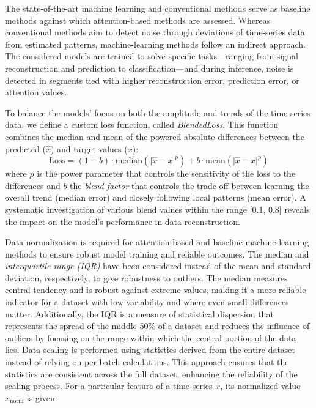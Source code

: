 \documentclass[conference]{IEEEtran}
\begin{document}
The state-of-the-art machine learning and conventional methods serve as baseline methods against which attention-based methods are assessed.
Whereas conventional methods aim to detect noise through deviations of time-series data from estimated patterns, machine-learning methods follow an indirect approach. The considered models are trained to solve specific tasks---ranging from signal reconstruction and prediction to classification---and during inference, noise is detected in segments tied with higher reconstruction error, prediction error, or attention values.

To balance the models' focus on both the amplitude and trends of the time-series data, we define a custom loss function, called \emph{BlendedLoss}. This function combines the median and mean of the powered absolute differences between the predicted ($\hat{x}$) and target values ($x$):
%
\begin{equation}
\text{Loss} =
  (1 - b)\cdot\mathrm{median}(\lvert \hat{x} - x \rvert^p) +
  b\cdot\mathrm{mean}(\lvert \hat{x} - x \rvert^p)
\label{eq:blended_loss}
\end{equation}
%
where $p$ is the power parameter that controls the sensitivity of the
loss to the differences and $b$ the \emph{blend factor} that controls
the trade-off between learning the overall trend (median error) and
closely following local patterns (mean error). A systematic
investigation of various blend values within the range [0.1, 0.8]
reveals the impact on the model's performance in data reconstruction.

Data normalization is required for attention-based and baseline machine-learning methods to ensure robust model training and reliable outcomes. The median and
\emph{interquartile range (IQR)} have been considered instead of the mean and
standard deviation, respectively, to give robustness to outliers.
The median measures central tendency and is robust against extreme values, making it a more reliable indicator for a dataset with low variability and where even small differences matter. Additionally, the IQR is a measure of statistical dispersion that represents the spread of the middle 50\% of a dataset and reduces the influence of outliers by focusing on the range within which the central portion of the data lies. Data scaling is performed using statistics derived from the entire dataset instead of relying on per-batch calculations. This approach ensures that the statistics are consistent across the full dataset, enhancing the reliability of the scaling process. For a particular feature of a time-series $x$, its normalized value $x_{\text{norm}}$ is given:
\end{document}
